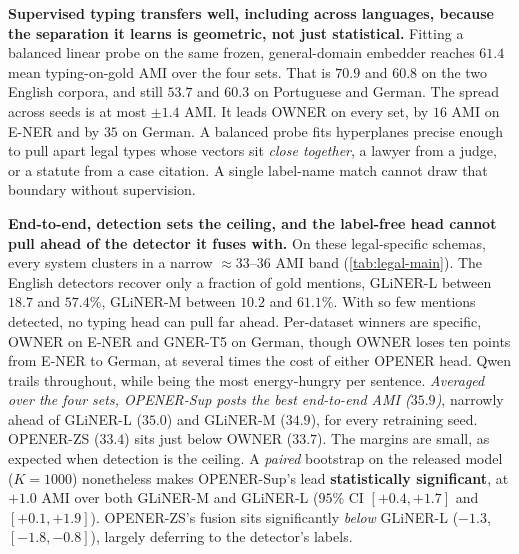 \textbf{Supervised typing transfers well, including across languages, because the separation it learns is geometric, not just statistical.} Fitting a balanced linear probe on the same frozen, general-domain embedder reaches $61.4$ mean typing-on-gold AMI over the four sets. That is $70.9$ and $60.8$ on the two English corpora, and still $53.7$ and $60.3$ on Portuguese and German. The spread across seeds is at most ${\pm}1.4$ AMI. It leads OWNER on every set, by $16$ AMI on E-NER and by $35$ on German.  A balanced probe fits hyperplanes precise enough to pull apart legal types whose vectors sit \emph{close together}, a lawyer from a judge, or a statute from a case citation. A single label-name match cannot draw that boundary without supervision. 

\textbf{End-to-end, detection sets the ceiling, and the label-free head cannot pull ahead of the detector it fuses with.} On these legal-specific schemas, every system clusters in a narrow $\approx 33$--$36$ AMI band (\autoref{tab:legal-main}). The English detectors recover only a fraction of gold mentions, GLiNER-L between $18.7$ and $57.4\%$, GLiNER-M between $10.2$ and $61.1\%$. With so few mentions detected, no typing head can pull far ahead. Per-dataset winners are specific, OWNER \citep{genest2025owner} on E-NER and GNER-T5 on German, though OWNER loses ten points from E-NER to German, at several times the cost of either OPENER head. Qwen trails throughout, while being the most energy-hungry per sentence. \emph{Averaged over the four sets, OPENER-Sup posts the best end-to-end AMI ($35.9$)}, narrowly ahead of GLiNER-L ($35.0$) and GLiNER-M ($34.9$), for every retraining seed. OPENER-ZS ($33.4$) sits just below OWNER ($33.7$). The margins are small, as expected when detection is the ceiling. A \emph{paired} bootstrap on the released model ($K{=}1000$) nonetheless makes OPENER-Sup's lead \textbf{statistically significant}, at $+1.0$ AMI over both GLiNER-M and GLiNER-L ($95\%$ CI $[+0.4,+1.7]$ and $[+0.1,+1.9]$). OPENER-ZS's fusion sits significantly \emph{below} GLiNER-L ($-1.3$, $[-1.8,-0.8]$), largely deferring to the detector's labels.

